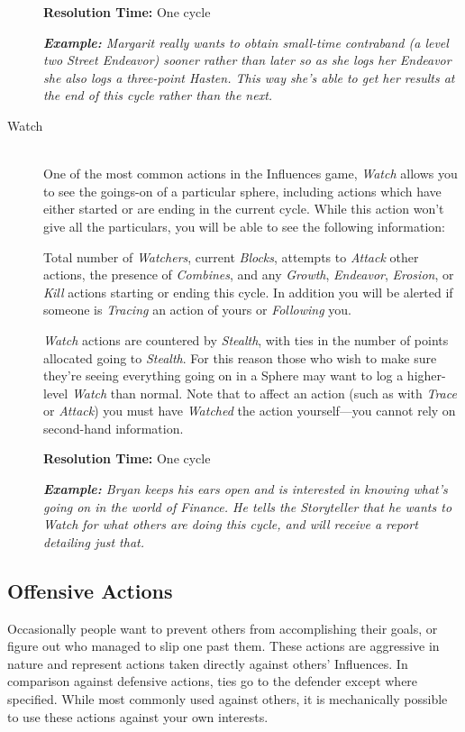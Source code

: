 \begin{description}
		\textbf{Resolution Time:} One cycle
		
		\emph{\textbf{Example:} Margarit really wants to obtain small-time contraband (a level two Street \emph{Endeavor}) 
		sooner rather than later so as she logs her \emph{Endeavor} she also logs a three-point \emph{Hasten}.  This way 
		she's able to get her results at the end of this cycle rather than the next.} \\
		
	\item[Watch] \hfill \\
		One of the most common actions in the Influences game, \emph{Watch} allows you to see the goings-on of a particular 
		sphere, including actions which have either started or are ending in the current cycle.  While this action won't 
		give all the particulars, you will be able to see the following information:
		
		Total number of \emph{Watchers}, current \emph{Blocks}, attempts to \emph{Attack} other actions, the presence of 
		\emph{Combines}, and any \emph{Growth}, \emph{Endeavor}, \emph{Erosion}, or \emph{Kill} actions starting or ending 
		this cycle.  In addition you will be alerted if someone is \emph{Tracing} an action of yours or \emph{Following} you.
		
		\emph{Watch} actions are countered by \emph{Stealth}, with ties in the number of points allocated going to \emph{Stealth}.  
		For this reason those who wish to make sure they're seeing everything going on in a Sphere may want to log a higher-level 
		\emph{Watch} than normal.  Note that to affect an action (such as with \emph{Trace} or \emph{Attack}) you must have 
		\emph{Watched} the action yourself---you cannot rely on second-hand information.
		
		\textbf{Resolution Time:} One cycle
		
		\emph{\textbf{Example:} Bryan keeps his ears open and is interested in knowing what's going on in the world 
		of \emph{Finance}.  He tells the Storyteller that he wants to \emph{Watch} for what others are doing 
		this cycle, and will receive a report detailing just that.} \\
\end{description}

\subsection{Offensive Actions}
Occasionally people want to prevent others from accomplishing their goals, or figure out who 
managed to slip one past them.  These actions are aggressive in nature and represent actions 
taken directly against others' Influences.  In comparison against defensive actions, ties go to 
the defender except where specified.  While most commonly used against others, it is mechanically 
possible to use these actions against your own interests. \\

